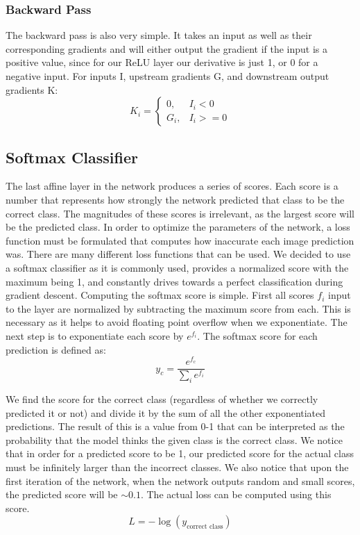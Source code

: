 \documentclass[conference]{IEEEtran}
\begin{document}
\subsubsection{Backward Pass}
The backward pass is also very simple. It takes an input as well as their corresponding gradients and will either output the gradient if the input is a positive value, since for our ReLU layer our derivative is just 1, or 0 for a negative input. For inputs I, upstream gradients G, and downstream output gradients K: 
\begin{equation} \label{eq:reluBackward}
    K_i = \begin{cases}
               0, & I_i < 0 \\
               G_i, & I_i >= 0 
          \end{cases}
\end{equation}

\subsection{Softmax Classifier}
The last affine layer in the network produces a series of scores. Each score is a number that represents how strongly the network predicted that class to be the correct class. The magnitudes of these scores is irrelevant, as the largest score will be the predicted class. In order to optimize the parameters of the network, a loss function must be formulated that computes how inaccurate each image prediction was. There are many different loss functions that can be used. We decided to use a softmax classifier as it is commonly used, provides a normalized score with the maximum being 1, and constantly drives towards a perfect classification during gradient descent. Computing the softmax score is simple. First all scores $f_i$ input to the layer are normalized by subtracting the maximum score from each. This is necessary as it helps to avoid floating point overflow when we exponentiate. The next step is to exponentiate each score by $e^{f_i}$. The softmax score for each prediction is defined as: 
\begin{equation}\label{eq:softmaxScore}
y_{c}=\frac{e^{f_{\text{c}}}}{ \sum\limits_{i}{e^{f_i}}}
\end{equation}

We find the score for the correct class (regardless of whether we correctly predicted it or not) and divide it by the sum of all the other exponentiated predictions. The result of this is a value from 0-1 that can be interpreted as the probability that the model thinks the given class is the correct class. We notice that in order for a predicted score to be 1, our predicted score for the actual class must be infinitely larger than the incorrect classes. We also notice that upon the first iteration of the network, when the network outputs random and small scores, the predicted score will be $\sim0.1$. The actual loss can be computed using this score. 
\begin{equation}\label{eq:softtmaxLoss}
L=-\log{(y_{\text{correct class}})}
\end{equation}
\end{document}
